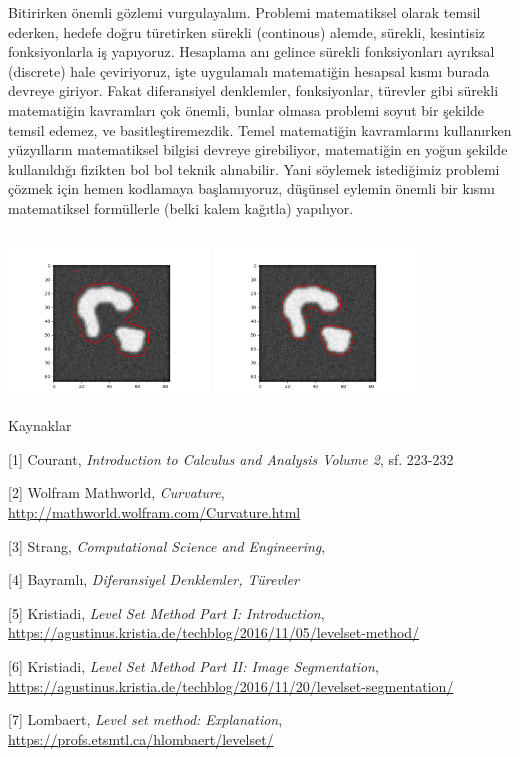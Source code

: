 \documentclass[12pt,fleqn]{article}\usepackage{../../common}
\begin{document}
Bitirirken önemli gözlemi vurgulayalım. Problemi matematiksel olarak temsil
ederken, hedefe doğru türetirken sürekli (continous) alemde, sürekli,
kesintisiz fonksiyonlarla iş yapıyoruz. Hesaplama anı gelince sürekli
fonksiyonları ayrıksal (discrete) hale çeviriyoruz, işte uygulamalı
matematiğin hesapsal kısmı burada devreye giriyor. Fakat diferansiyel
denklemler, fonksiyonlar, türevler gibi sürekli matematiğin kavramları çok
önemli, bunlar olmasa problemi soyut bir şekilde temsil edemez, ve
basitleştiremezdik. Temel matematiğin kavramlarını kullanırken yüzyılların
matematiksel bilgisi devreye girebiliyor, matematiğin en yoğun şekilde
kullanıldığı fizikten bol bol teknik alınabilir. Yani söylemek istediğimiz
problemi çözmek için hemen kodlamaya başlamıyoruz, düşünsel eylemin önemli
bir kısmı matematiksel formüllerle (belki kalem kağıtla) yapılıyor.

\inputminted[fontsize=\footnotesize]{python}{levelset2o.py}

\includegraphics[height=4cm]{img1/level_2_040.png}
\includegraphics[height=4cm]{img1/level_2_100.png}

Kaynaklar

[1] Courant, {\em Introduction to Calculus and Analysis Volume 2}, sf. 223-232

[2] Wolfram Mathworld, {\em Curvature}, \url{http://mathworld.wolfram.com/Curvature.html}

[3] Strang, {\em Computational Science and Engineering},

[4] Bayramlı, {\em Diferansiyel Denklemler, Türevler}

[5] Kristiadi, {\em Level Set Method Part I: Introduction},
    \url{https://agustinus.kristia.de/techblog/2016/11/05/levelset-method/}

[6] Kristiadi, {\em Level Set Method Part II: Image Segmentation},
    \url{https://agustinus.kristia.de/techblog/2016/11/20/levelset-segmentation/}

[7] Lombaert, {\em Level set method: Explanation},
    \url{https://profs.etsmtl.ca/hlombaert/levelset/}
\end{document}
